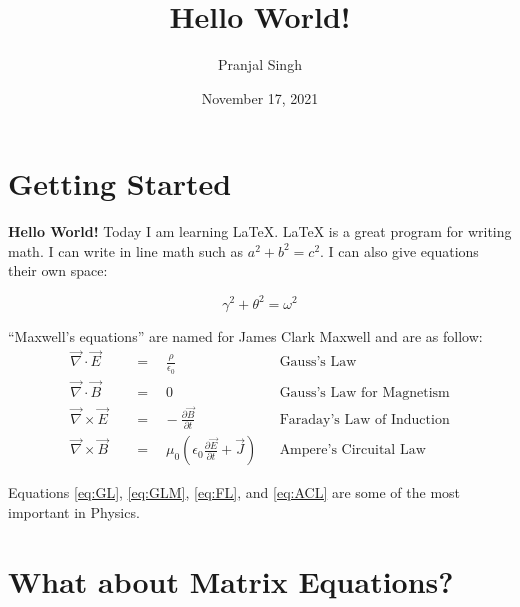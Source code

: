 \documentclass{article}
\title{Hello World!}\author{Pranjal Singh}\date{November 17, 2021}
\begin{document}
    \maketitle
    \thispagestyle{empty} 
    \section{Getting Started}
    \textbf{Hello World!} Today I am learning \LaTeX. \LaTeX{} is a great program for writing math. I can write in line math such as $a^2+b^2=c^2$. I can also give equations their own space:
     
    \begin{equation}\gamma^2+\theta^2=
\omega^2\end{equation}

    ``Maxwell's equations'' are named for James Clark Maxwell and are as follow:
    \begin{align}
    \vec{\nabla} \cdot \vec{E} \quad &
=
\quad\frac{\rho}{\epsilon_0} &&\text{Gauss's Law} \label{eq:GL}\\
\vec{\nabla} \cdot \vec{B} \quad &
=\quad 0 &&\text{Gauss's Law for Magnetism} \label{eq:GLM}\\
\vec{\nabla} \times \vec{E} \quad &
=
\hspace{10pt}-\frac{\partial{\vec{B}}}{\partial{t}} &&\text{Faraday's Law of Induction} \label{eq:FL}\\
\vec{\nabla} \times \vec{B} \quad &=
\quad \mu_0\left( \epsilon_0\frac{\partial{\vec{E}}}{\partial{t}}+\vec{J}\right) &&\text{Ampere's Circuital Law}
     \label{eq:ACL}
    \end{align}


Equations \ref{eq:GL}, \ref{eq:GLM}, \ref{eq:FL}, and \ref{eq:ACL} are some of the most important in Physics.
\notag


\section{What about Matrix Equations?}
\notag
\end{document}
